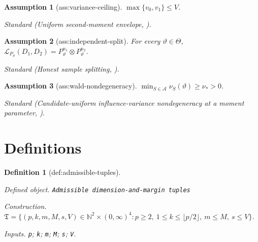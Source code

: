 \documentclass{article}
\newtheorem{assumption}{Assumption}
\newtheorem{definition}{Definition}
\begin{document}
\begin{assumption}[ass:variance-ceiling]\label{ass:variance-ceiling}
\(\max\{v_0,v_1\}\le V\).
\par\smallskip\noindent\emph{Standard} (Uniform second-moment envelope, \cite{lin2026smooth}).
\end{assumption}

\begin{assumption}[ass:independent-split]\label{ass:independent-split}
For every \(\vartheta\in\Theta\), \(\mathcal L_{P_{\vartheta}}(D_1,D_2)=P_{\vartheta}^{n_1}\otimes P_{\vartheta}^{n_2}\).
\par\smallskip\noindent\emph{Standard} (Honest sample splitting, \cite{ji2023modelagnostic}).
\end{assumption}

\begin{assumption}[ass:wald-nondegeneracy]\label{ass:wald-nondegeneracy}
\(\min_{S\in\mathcal A}\nu_S(\vartheta)\ge\nu_*>0\).
\par\smallskip\noindent\emph{Standard} (Candidate-uniform influence-variance nondegeneracy at a moment parameter, \cite{vandervaart1998asymptotic}).
\end{assumption}

\section{Definitions}

\begin{definition}[def:admissible-tuples]\label{def:admissible-tuples}
\par\smallskip\noindent\emph{Defined object.} \texttt{Admissible dimension-\allowbreak{}and-\allowbreak{}margin tuples}
\par\smallskip\noindent\emph{Construction.} \(\mathfrak T=\{(p,k,m,M,s,V)\in\mathbb N^2\times(0,\infty)^4:p\ge2,\ 1\le k\le\lfloor p/2\rfloor,\ m\le M,\ s\le V\}\).
\par\smallskip\noindent\emph{Inputs.} \texttt{p}; \texttt{k}; \texttt{m}; \texttt{M}; \texttt{s}; \texttt{V}.
\end{definition}
\end{document}
